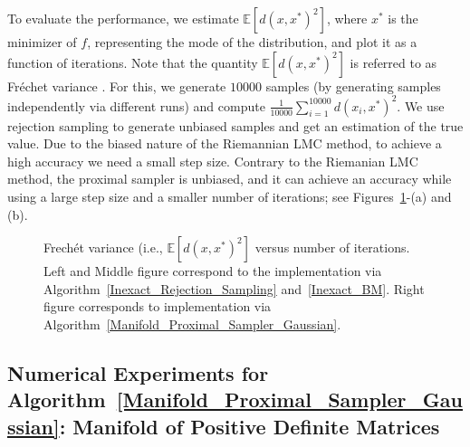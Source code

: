 To evaluate the performance, we estimate $\mathbb{E}[d(x, x^{*})^{2}]$, where $x^{*}$ is the minimizer of $f$, representing the mode of the distribution, and plot it as a function of iterations. Note that the quantity $\mathbb{E}[d(x, x^{*})^{2}]$ is referred to as Fr{\'e}chet variance \cite{frechet1948elements,dubey2019frechet}. For this, we generate $10000$ samples (by generating samples independently via different runs) and compute $\frac{1}{10000}\sum_{i = 1}^{10000} d(x_{i}, x^{*})^{2}$. We use rejection sampling to generate unbiased samples and get an estimation of the true value. 
Due to the biased nature of the Riemannian LMC method, to achieve a high accuracy we need a small step size. Contrary to the Riemanian LMC method, the proximal sampler is unbiased, and it can achieve an accuracy while using a large step size and a smaller number of iterations; see Figures~\ref{fig:figures}-(a) and (b). 


\begin{figure}
\centering
{}
\caption{Frech\'et variance (i.e., \texorpdfstring{$\mathbb{E}[d(x, x^{*})^{2}]$}{E} versus number of iterations. Left and Middle figure correspond to the implementation via Algorithm~\ref{Inexact_Rejection_Sampling} and~\ref{Inexact_BM}. Right figure corresponds to implementation via  Algorithm~\ref{Manifold_Proximal_Sampler_Gaussian}. }
\label{fig:figures}
\end{figure}


\subsection{Numerical Experiments for Algorithm~\ref{Manifold_Proximal_Sampler_Gaussian}: Manifold of Positive Definite Matrices}\label{vardhanimplem}

